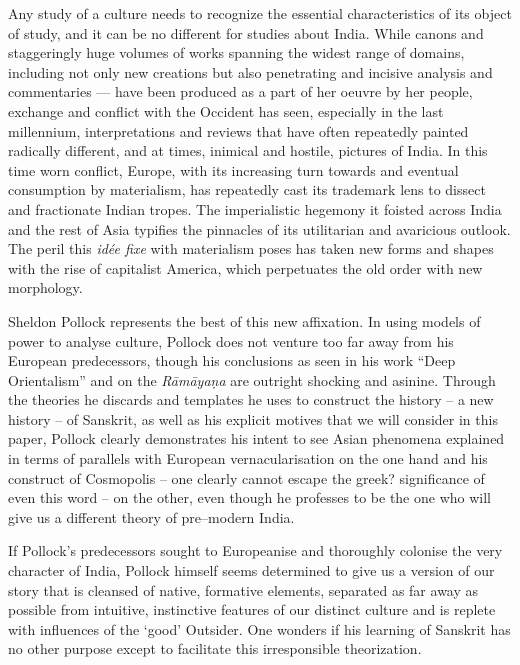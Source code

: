 Any study of a culture needs to recognize the essential characteristics of its object of study, and it can be no different for studies about India. While canons and staggeringly huge volumes of works spanning the widest range of domains, including not only new creations but also penetrating and incisive analysis and commentaries — have been produced as a part of her oeuvre by her people, exchange and conflict with the Occident has seen, especially in the last millennium, interpretations and reviews that have often repeatedly painted radically different, and at times, inimical and hostile, pictures of India. In this time worn conflict, Europe, with its increasing turn towards and eventual consumption by materialism, has repeatedly cast its trademark lens to dissect and fractionate Indian tropes. The imperialistic hegemony it foisted across India and the rest of Asia typifies the pinnacles of its utilitarian and avaricious outlook. The peril this \textit{idée fixe} with materialism poses has taken new forms and shapes with the rise of capitalist America, which perpetuates the old order with new morphology.

Sheldon Pollock represents the best of this new affixation. In using models of power to analyse culture, Pollock does not venture too far away from his European predecessors, though his conclusions as seen in his work “Deep Orientalism” and on the \textit{Rāmāyaṇa} are outright shocking and asinine. Through the theories he discards and templates he uses to construct the history – a new history – of Sanskrit, as well as his explicit motives that we will consider in this paper, Pollock clearly demonstrates his intent to see Asian phenomena explained in terms of parallels with European vernacularisation on the one hand and his construct of Cosmopolis – one clearly cannot escape the greek? significance of even this word – on the other, even though he professes to be the one who will give us a different theory of pre–modern India.

If Pollock’s predecessors sought to Europeanise and thoroughly colonise the very character of India, Pollock himself seems determined to give us a version of our story that is cleansed of native, formative elements, separated as far away as possible from intuitive, instinctive features of our distinct culture and is replete with influences of the ‘good’ Outsider. One wonders if his learning of Sanskrit has no other purpose except to facilitate this irresponsible theorization.

